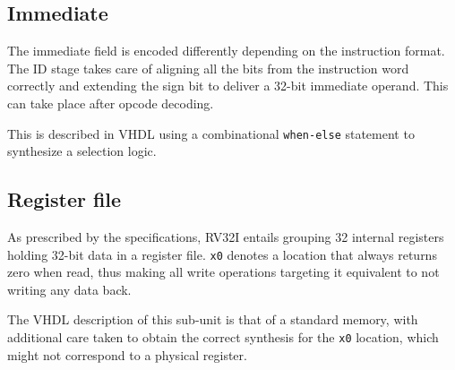 \subsection{Immediate} The immediate field is encoded differently depending on the instruction format. The ID stage takes care of aligning all the bits from the instruction word correctly and extending the sign bit to deliver a 32-bit immediate operand. This can take place after opcode decoding.

This is described in VHDL using a combinational \texttt{when-else} statement to synthesize a selection logic.

\subsection{Register file} As prescribed by the specifications, RV32I entails grouping 32 internal registers holding 32-bit data in a register file. \texttt{x0} denotes a location that always returns zero when read, thus making all write operations targeting it equivalent to not writing any data back.  

The VHDL description of this sub-unit is that of a standard memory, with additional care taken to obtain the correct synthesis for the \texttt{x0} location, which might not correspond to a physical register.